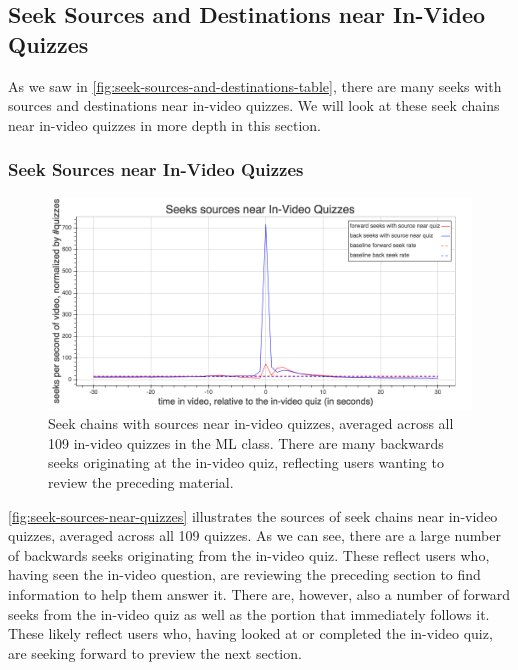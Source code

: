 \documentclass{sigchi}
\begin{document}
\subsection{Seek Sources and Destinations near In-Video Quizzes}

As we saw in \autoref{fig:seek-sources-and-destinations-table}, there are many seeks with sources and destinations near in-video quizzes. We will look at these seek chains near in-video quizzes in more depth in this section.

\subsubsection{Seek Sources near In-Video Quizzes}

\begin{figure}
\includegraphics[width=1.0\columnwidth]{seek-sources-near-quizzes}
\caption{Seek chains with sources near in-video quizzes, averaged across all 109 in-video quizzes in the ML class. There are many backwards seeks originating at the in-video quiz, reflecting users wanting to review the preceding material.}
\label{fig:seek-sources-near-quizzes}
\end{figure}

\autoref{fig:seek-sources-near-quizzes} illustrates the sources of seek chains near in-video quizzes, averaged across all 109 quizzes. As we can see, there are a large number of backwards seeks originating from the in-video quiz. These reflect users who, having seen the in-video question, are reviewing the preceding section to find information to help them answer it. There are, however, also a number of forward seeks from the in-video quiz as well as the portion that immediately follows it. These likely reflect users who, having looked at or completed the in-video quiz, are seeking forward to preview the next section.
\end{document}
